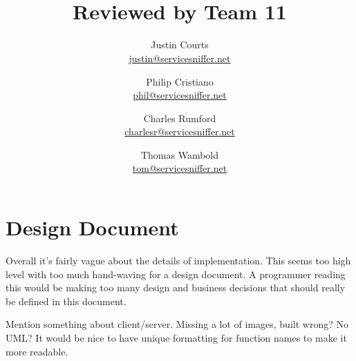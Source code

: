 \documentclass{article}
\title{\textbf{\mytitle} \\ {\large Reviewed by Team 11}}
\author{
    Justin Courts \\\url{justin@servicesniffer.net}
    \and Philip Cristiano \\\url{phil@servicesniffer.net}
    \and Charles Rumford \\\url{charlesr@servicesniffer.net}
    \and Thomas Wambold \\\url{tom@servicesniffer.net}
}
\date{\mydate}
\begin{document}
\maketitle


\section{Design Document}

Overall it's fairly vague about the details of implementation.  This seems too
high level with too much hand-waving for a design document.  A programmer
reading this would be making too many design and business decisions that should
really be defined in this document.

Mention something about client/server.  Missing a lot of images, built wrong?
No UML?  It would be nice to have unique formatting for function names to make
it more readable.
\end{document}
